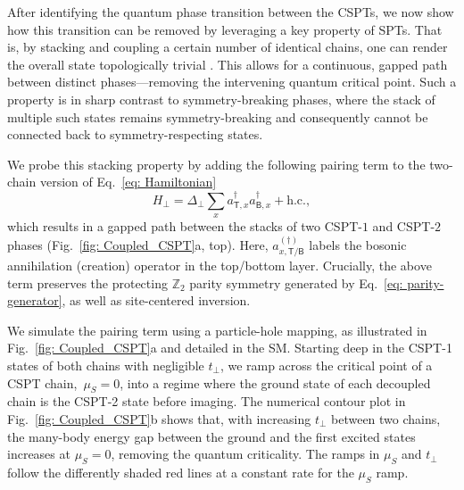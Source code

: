 \documentclass[preprint,superscriptaddress,floatfix, nofootinbib]{revtex4-2}
\begin{document}
After identifying the quantum phase transition between the CSPTs, we now show how this transition can be removed by leveraging a key property of SPTs.
%
That is, by stacking and coupling a certain number of identical chains, one can render the overall state topologically trivial \cite{Turner11, Fidkowski11, Pollmann2012, Schuch2011, Chen2011, Chen2012}. This allows for a continuous, gapped path between distinct phases---removing the intervening quantum critical point.
%
Such a property is in sharp contrast to symmetry-breaking phases, where the stack of multiple such states remains symmetry-breaking and consequently cannot be connected back to symmetry-respecting states.

We probe this stacking property by adding the following pairing term to the two-chain version of Eq.~\eqref{eq: Hamiltonian}
\begin{equation}
    H_{\perp} = \Delta_{\perp} \sum_{x} a^{\dagger}_{\mathsf{T}, x} a^{\dagger}_{\mathsf{B}, x}   + \text{h.c.},
\label{eq: coupling}
\end{equation}
which results in a gapped path between the stacks of two CSPT-$1$ and CSPT-$2$ phases (Fig.~\ref{fig: Coupled_CSPT}a, top). Here, $a_{x, \mathsf{T}/\mathsf{B}}^{(\dagger)}$ labels the bosonic annihilation (creation) operator in the top/bottom layer.
%
Crucially, the above term preserves the protecting $\mathbb{Z}_2$ parity symmetry generated by Eq.~\eqref{eq: parity-generator}, as well as site-centered inversion.
%

We simulate the pairing term using a particle-hole mapping, as illustrated in Fig.~\ref{fig: Coupled_CSPT}a and detailed in the SM. Starting deep in the CSPT-1 states of both chains with negligible $t_\perp$, we ramp across the critical point of a CSPT chain,~$\mu_S=0$, into a regime where the ground state of each decoupled chain is the CSPT-2 state before imaging. 
The numerical contour plot in Fig.~\ref{fig: Coupled_CSPT}b shows that, with increasing $t_\perp$ between two chains, the many-body energy gap between the ground and the first excited states increases at $\mu_S=0$, removing the quantum criticality. The ramps in $\mu_S$ and $t_\perp$ follow the differently shaded red lines at a constant rate for the $\mu_S$ ramp.
\end{document}
